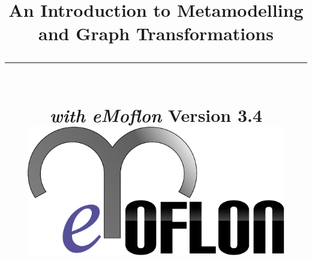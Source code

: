 \title{
\flushright
{\LARGE\bfseries An Introduction to Metamodelling\\
and Graph Transformations}
\noindent\rule[-1ex]{\textwidth}{5pt}\\[2.5ex]
\hfill\emph{\LARGE\bfseries with eMoflon}
\flushleft
{\small Version 3.4}
\flushright
\includegraphics[width=0.85\textwidth]{pics/eMoflon3} 
}

\date{}  
\author{} 